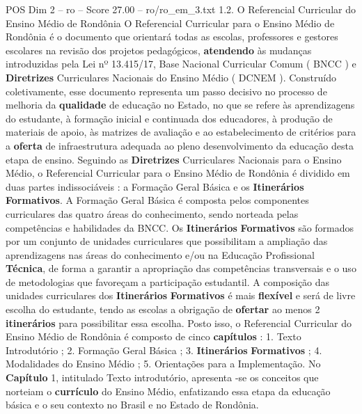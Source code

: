 \begin{textsample}{POS Dim 2 – ro – Score 27.00 – ro/ro\_em\_3.txt}  \label{ex:f2_pos_186}
1.2.
O Referencial Curricular do Ensino Médio de Rondônia O Referencial Curricular para o Ensino Médio de Rondônia é o documento que orientará todas as escolas, professores e gestores escolares na revisão dos projetos pedagógicos, \textbf{atendendo} às mudanças introduzidas pela Lei nº 13.415/17, Base Nacional Curricular Comum ( BNCC ) e \textbf{Diretrizes} Curriculares Nacionais do Ensino Médio ( DCNEM ).
Construído coletivamente, esse documento representa um passo decisivo no processo de melhoria da \textbf{qualidade} de educação no Estado, no que se refere às aprendizagens do estudante, à formação inicial e continuada dos educadores, à produção de materiais de apoio, às matrizes de avaliação e ao estabelecimento de critérios para a \textbf{oferta} de infraestrutura adequada ao pleno desenvolvimento da educação desta etapa de ensino.
Seguindo as \textbf{Diretrizes} Curriculares Nacionais para o Ensino Médio, o Referencial Curricular para o Ensino Médio de Rondônia é dividido em duas partes indissociáveis : a Formação Geral Básica e os \textbf{Itinerários} \textbf{Formativos}.
A Formação Geral Básica é composta pelos componentes curriculares das quatro áreas do conhecimento, sendo norteada pelas competências e habilidades da BNCC.
Os \textbf{Itinerários} \textbf{Formativos} são formados por um conjunto de unidades curriculares que possibilitam a ampliação das aprendizagens nas áreas do conhecimento e/ou na Educação Profissional \textbf{Técnica}, de forma a garantir a apropriação das competências transversais e o uso de metodologias que favoreçam a participação estudantil.
A composição das unidades curriculares dos \textbf{Itinerários} \textbf{Formativos} é mais \textbf{flexível} e será de livre escolha do estudante, tendo as escolas a obrigação de \textbf{ofertar} ao menos 2 \textbf{itinerários} para possibilitar essa escolha.
Posto isso, o Referencial Curricular do Ensino Médio de Rondônia é composto de cinco \textbf{capítulos} : 1.
Texto Introdutório ; 2.
Formação Geral Básica ; 3. \textbf{Itinerários} \textbf{Formativos} ; 4.
Modalidades do Ensino Médio ; 5.
Orientações para a Implementação.
No \textbf{Capítulo} 1, intitulado Texto introdutório, apresenta -se os conceitos que norteiam o \textbf{currículo} do Ensino Médio, enfatizando essa etapa da educação básica e o seu contexto no Brasil e no Estado de Rondônia.

\end{textsample}
